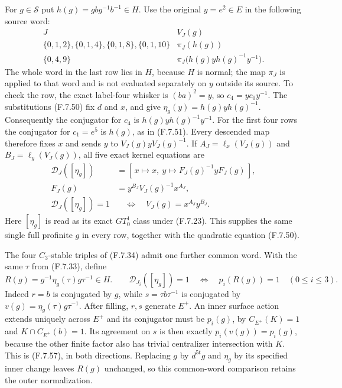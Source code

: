 For $g\in\mathscr S$ put $h(g)=g b g^{-1}b^{-1}\in H$.
Use the original $y=e^2\in E$ in the following
source word:
\[
 \begin{array}{c|c}
 J& V_J(g)\\ \hline
 \{0,1,2\},\{0,1,4\},\{0,1,8\},\{0,1,10\}
       &\pi_J(h(g))\\
 \{0,4,9\}&
          \pi_J\bigl(h(g)y h(g)^{-1}y^{-1}\bigr).
 \end{array}                                                   \tag{F.7.55}
\]
The whole word in the last row lies in $H$,
because $H$ is normal; the map $\pi_J$ is
applied to that word and is not evaluated
separately on $y$ outside its source.
To check the row, the exact label-four
whisker is $(ba)^2=y$, so $c_4=yc_0y^{-1}$.
The substitutions (F.7.50) fix $d$ and $x$,
and give $\eta_g(y)=h(g)y h(g)^{-1}$.
Consequently the conjugator for $c_4$ is
$h(g)y h(g)^{-1}y^{-1}$.
For the first four rows the conjugator for
$c_1=e^5$ is $h(g)$, as in (F.7.51).
Every descended map therefore fixes $x$ and
sends $y$ to $V_J(g)yV_J(g)^{-1}$.
If $A_J=\ell_x(V_J(g))$ and
$B_J=\ell_y(V_J(g))$, all five exact kernel
equations are
\[
 \begin{split}
 \mathcal D_J([\eta_g])&=
       [\,x\mapsto x,\ 
          y\mapsto F_J(g)^{-1}yF_J(g)\,],\\
 F_J(g)&=y^{B_J}V_J(g)^{-1}x^{A_J},\\
 \mathcal D_J([\eta_g])=1
             &\quad\Longleftrightarrow\quad
                   V_J(g)=x^{A_J}y^{B_J}.
 \end{split}                                                   \tag{F.7.56}
\]
Here $[\eta_g]$ is read as its exact $GT_0^1$
class under (F.7.23).
This supplies the same single full profinite
$g$ in every row, together with the
quadratic equation (F.7.50).

The four $C_3$-stable triples of (F.7.34) admit
one further common word.  With the same
$\tau$ from (F.7.33), define
\[
 R(g)=g^{-1}\eta_g(\tau)g\tau^{-1}\in H.
 \qquad
 \mathcal D_{J_i}([\eta_g])=1
       \quad\Longleftrightarrow\quad p_i(R(g))=1
       \quad(0\leq i\leq3).
                                                               \tag{F.7.57}
\]
Indeed $r=b$ is conjugated by $g$, while
$s=\tau b\tau^{-1}$ is conjugated by
$v(g)=\eta_g(\tau)g\tau^{-1}$.
After filling, $r,s$ generate $E^+$.
An inner surface action extends uniquely across
$E^+$ and its conjugator must be $p_i(g)$,
by $C_{E^+}(K)=1$ and
$K\cap C_{E^+}(b)=1$.
Its agreement on $s$ is then exactly
$p_i(v(g))=p_i(g)$, because the other finite
factor also has trivial centralizer intersection
with $K$.  This is (F.7.57), in both directions.
Replacing $g$ by $d^{5t}g$ and $\eta_g$ by its
specified inner change leaves $R(g)$ unchanged,
so this common-word comparison retains the
outer normalization.

